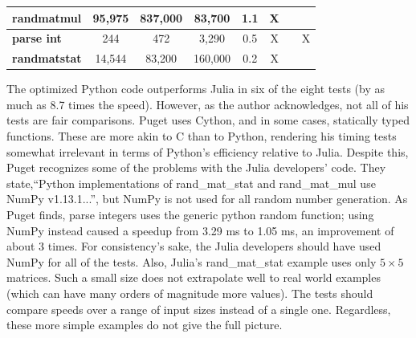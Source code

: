 \documentclass[12pt]{article}
\begin{document}
\begin{table}[ht]
\begin{tabular}{|l|c|c|c|c|c|c|c|}
\textbf{randmatmul}          & 95,975         & 837,000                                                          & 83,700                                                               & 1.1                                                                         & X              &                &                 \\ \hline
\textbf{parse int}           & 244            & 472                                                              & 3,290                                                                & 0.5                                                                         & X              &                & X               \\ \hline
\textbf{randmatstat}         & 14,544         & 83,200                                                           & 160,000                                                              & 0.2                                                                         & X              &                &                 \\ \hline
\end{tabular}
\end{table}

The optimized Python code outperforms Julia in six of the eight tests (by as much as 8.7 times the speed). However, as the author acknowledges, not all of his tests are fair comparisons. Puget uses Cython, and in some cases, statically typed functions. These are more akin to C than to Python, rendering his timing tests somewhat irrelevant in terms of Python's efficiency relative to Julia. Despite this, Puget recognizes some of the problems with the Julia developers' code. They state,``Python implementations of rand\_mat\_stat and rand\_mat\_mul use NumPy v1.13.1...'', but NumPy is not used for all random number generation. As Puget finds, parse integers uses the generic python random function; using NumPy instead caused a speedup from 3.29 ms to 1.05 ms, an improvement of about 3 times\cite{pugetdevworks}. For consistency's sake, the Julia developers should have used NumPy for all of the tests. Also, Julia's rand\_mat\_stat example uses only $5 \times 5$ matrices\cite{pugetdevworks}. Such a small size does not extrapolate well to real world examples (which can have many orders of magnitude more values). The tests should compare speeds over a range of input sizes instead of a single one. Regardless, these more simple examples do not give the full picture.
\end{document}
